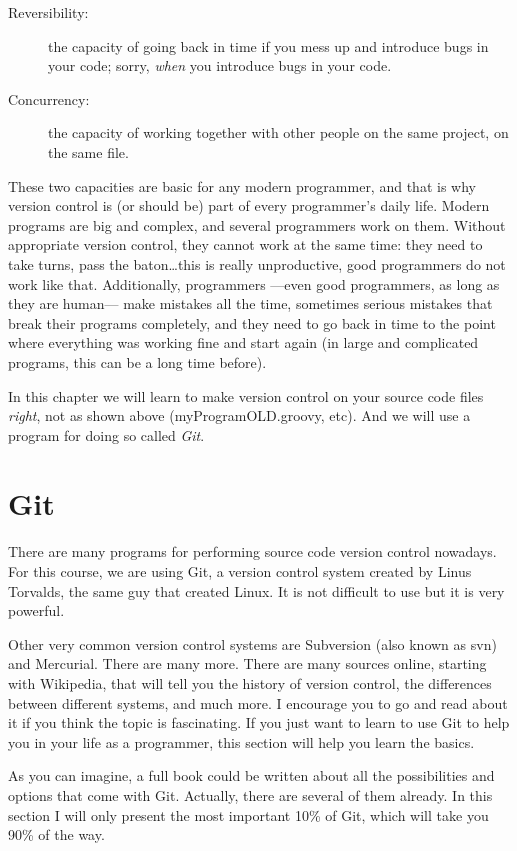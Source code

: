 \begin{description}
\item[Reversibility: ] the capacity of going back in time if you mess
  up and introduce bugs in your code; sorry, \emph{when} you introduce
  bugs in your code.
\item[Concurrency: ] the capacity of working together with other
  people on the same project, on the same file. 
\end{description}

These two capacities are basic for any modern programmer, and that is
why version control is (or should be) part of every programmer's daily
life. Modern programs are big and complex, and several programmers
work on them. Without appropriate version control, they cannot work at
the same time: they need to take turns, pass the baton\ldots this is
really unproductive, good programmers do not work like
that. Additionally, programmers ---even good programmers, as long as
they are human--- make mistakes all the time, sometimes serious
mistakes that break their programs completely, and they need to go
back in time to the point where everything was working fine and start
again (in large and complicated programs, this can be a long time
before).

In this chapter we will learn to make version control on your source
code files \emph{right}, not as shown above (myProgramOLD.groovy,
etc). And we will use a program for doing so called \emph{Git}.

\section{Git}
\label{sec:git}

There are many programs for performing source code version control
nowadays. For this course, we are using Git, a version control system
created by Linus Torvalds, the same guy that created Linux. It is not
difficult to use but it is very powerful. 

Other very common version control systems are Subversion (also known
as svn) and Mercurial. There are many more. There are many sources
online, starting with Wikipedia, that will tell you the history of
version control, the differences between different systems, and much
more. I encourage you to go and read about it if you think the topic
is fascinating. If you just want to learn to use Git to help you in
your life as a programmer, this section will help you learn the
basics. 

As you can imagine, a full book could be written about all the
possibilities and options that come with Git. Actually, there are
several of them already. In this section I will only present the most
important 10\% of Git, which will take you 90\% of the way. 

